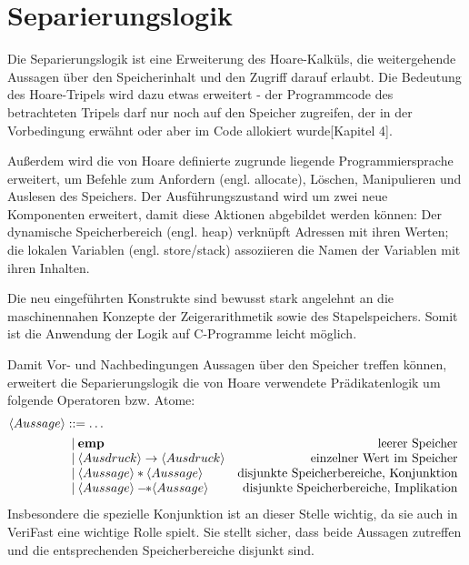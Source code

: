\section{Separierungslogik}
\label{sec:theorie:seperation-logic}

Die Separierungslogik ist eine Erweiterung des Hoare-Kalküls, die weitergehende Aussagen über den Speicherinhalt
und den Zugriff darauf erlaubt. Die Bedeutung des Hoare-Tripels wird dazu etwas erweitert - der Programmcode des
betrachteten Tripels darf nur noch auf den Speicher zugreifen, der in der Vorbedingung erwähnt oder aber im Code
allokiert wurde\cite{reynolds-2002}[Kapitel 4].

Außerdem wird die von Hoare definierte zugrunde liegende Programmiersprache erweitert, um Befehle zum Anfordern (engl. allocate), 
Löschen, Manipulieren und Auslesen des Speichers. Der Ausführungszustand wird um zwei neue Komponenten erweitert, damit 
diese Aktionen abgebildet werden können: Der dynamische Speicherbereich (engl. heap) verknüpft Adressen mit ihren
Werten; die lokalen Variablen (engl. store/stack) assoziieren die Namen der Variablen mit ihren Inhalten. 

Die neu eingeführten Konstrukte sind bewusst stark angelehnt an die maschinennahen Konzepte der Zeigerarithmetik sowie des
Stapelspeichers. Somit ist die Anwendung der Logik auf C-Programme leicht möglich.

Damit Vor- und Nachbedingungen Aussagen über den Speicher treffen können, erweitert die Separierungslogik die
von Hoare verwendete Prädikatenlogik um folgende Operatoren bzw. Atome: 
\begin{align*}
\langle Aussage \rangle & ::= \dots \\
& \begin{array}{l r}
  | \: \textbf{emp} & \textrm{leerer Speicher}\\
  | \: \langle Ausdruck \rangle \to \langle Ausdruck \rangle & \textrm{einzelner Wert im Speicher}\\
  | \: \langle Aussage \rangle \ast \langle Aussage \rangle & \textrm{disjunkte Speicherbereiche, Konjunktion}\\
  | \: \langle Aussage \rangle -\!\! \ast \langle Aussage \rangle & \textrm{disjunkte Speicherbereiche, Implikation}\\
\end{array}
\end{align*}
Insbesondere die spezielle Konjunktion ist an dieser Stelle wichtig, da sie auch in VeriFast eine wichtige Rolle spielt.
Sie stellt sicher, dass beide Aussagen zutreffen und die entsprechenden Speicherbereiche disjunkt sind. 

